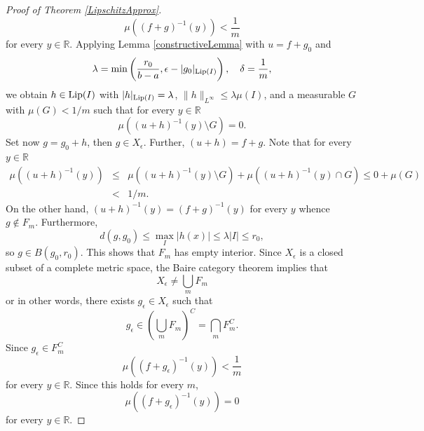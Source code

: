\documentclass{amsart}
\numberwithin{equation}{section}
\begin{document}
\begin{proof}[Proof of Theorem \ref{LipschitzApprox}]
\begin{equation}
    \nonumber
    \mu((f+g)^{-1}(y))<\frac{1}{m}
\end{equation}
for every $y\in\mathbb{R}$.
Applying Lemma \ref{constructiveLemma} with $u=f+g_0$ and
$$
\lambda=\min\left(\frac{r_0}{b-a}, \epsilon-|g_0|_{{\rm Lip}(I)}\right),\quad\delta=\frac{1}{m},
$$
we obtain $h\in{\rm Lip}(I)$ with $|h|_{{\rm Lip}(I)}=\lambda$, $\|h\|_{L^\infty}\le\lambda\mu(I)$, and a measurable $G$ with $\mu(G)<1/m$ such that for every $y\in\mathbb{R}$
$$
\mu((u+h)^{-1}(y)\setminus G)=0.
$$
Set now $g=g_0+h$, then $g\in X_\epsilon$. Further, $(u+h)=f+g$. Note that for every $y\in\mathbb{R}$
\begin{eqnarray}
    \nonumber
    \mu((u+h)^{-1}(y))&\le&\mu((u+h)^{-1}(y)\setminus G)+\mu((u+h)^{-1}(y)\cap G)\le 0+\mu(G)\\
    \nonumber
    &<&1/m.
\end{eqnarray}
On the other hand, $(u+h)^{-1}(y)=(f+g)^{-1}(y)$ for every $y$ whence $g\notin F_m$. Furthermore,
$$
d(g,g_0)\le\max_I|h(x)|\le\lambda|I|\le r_0,
$$
so $g\in B(g_0,r_0)$. This shows that $F_m$ has empty interior.
Since  $X_\epsilon$ is a closed subset of a complete metric space, the Baire category theorem implies that
$$
X_\epsilon\neq\bigcup_mF_m
$$
or in other words, there exists $g_\epsilon\in X_\epsilon$ such that
$$
g_\epsilon\in \left(\bigcup_mF_m\right)^C=\bigcap_m F_m^C.
$$
Since $g_\epsilon\in F_m^C$
\begin{equation}
    \nonumber
    \mu((f+g_\epsilon)^{-1}(y))<\frac{1}{m}
\end{equation}
for every $y\in\mathbb{R}$. Since this holds for every $m$,
\begin{equation}
    \nonumber
    \mu((f+g_\epsilon)^{-1}(y))=0
\end{equation}
for every $y\in\mathbb{R}$.
\end{proof}




\end{document}
